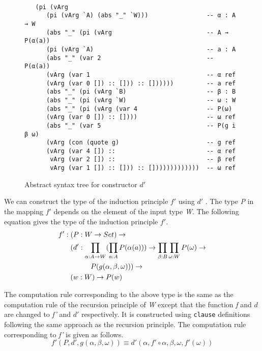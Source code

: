 \documentclass[sigplan,10pt]{acmart}
\begin{document}
\begin{figure}
\begin{center}
\begingroup
\fontsize{7pt}{9pt}\selectfont
\begin{Verbatim}[frame = single]

   (pi (vArg
      (pi (vArg `A) (abs "_" `W)))                -- α : A → W
      (abs "_" (pi (vArg                          -- A → P(α(a))
      (pi (vArg `A)                               -- a : A
      (abs "_" (var 2                             -- P(α(a))
      (vArg (var 1                                -- α ref
      (vArg (var 0 []) :: [])) :: [])))))         -- a ref
      (abs "_" (pi (vArg `B)                      -- β : B
      (abs "_" (pi (vArg `W)                      -- ω : W
      (abs "_" (pi (vArg (var 4                   -- P(ω)
      (vArg (var 0 []) :: [])))                   -- ω ref
      (abs "_" (var 5                             -- P(g i β ω)
      (vArg (con (quote g)                        -- g ref
      (vArg (var 4 []) ::                         -- α ref
       vArg (var 2 []) ::                         -- β ref
       vArg (var 1 []) :: [])) :: []))))))))))))  -- ω ref

\end{Verbatim}
\endgroup
\end{center}
\caption{Abstract syntax tree for constructor $d'$}
\label{fig:ast-d'}
\end{figure}

\normalsize

We can construct the type of the induction principle $f'$ using $d'$ . The type \emph{P} in the mapping $f'$ depends on the element of the input type \emph{W}. The following equation gives the type of the induction principle $f'$.
\begin{align}
& f' : (P : W \rightarrow Set) \rightarrow \nonumber \\
& \hspace {0.6cm} (d' : \prod_{\alpha : A \rightarrow W} (\prod_{a : A} P(\alpha (a))) \rightarrow \prod_{\beta : B} \prod_{\omega : W} P(\omega) \rightarrow \nonumber \\
& \hspace {1.6cm} P (g(\alpha, \beta, \omega))) \rightarrow \nonumber \\
& \hspace {0.6cm} (w : W) \rightarrow P (w) \nonumber
\end{align}

The computation rule corresponding to the above type is the same as the computation rule of the recursion principle of \emph{W} except that the function \emph{f} and $d$ are changed to \emph{f'} and $d'$ respectively. It is constructed using {\tt clause} definitions following the same approach as the recursion principle. The computation rule corresponding to \emph{f'} is given as follows.
\begin{equation}
f' (P, d', g (\alpha, \beta, \omega)) \equiv d' (\alpha, f' \circ \alpha, \beta, \omega, f' (\omega)) \nonumber
\end{equation}
\end{document}
